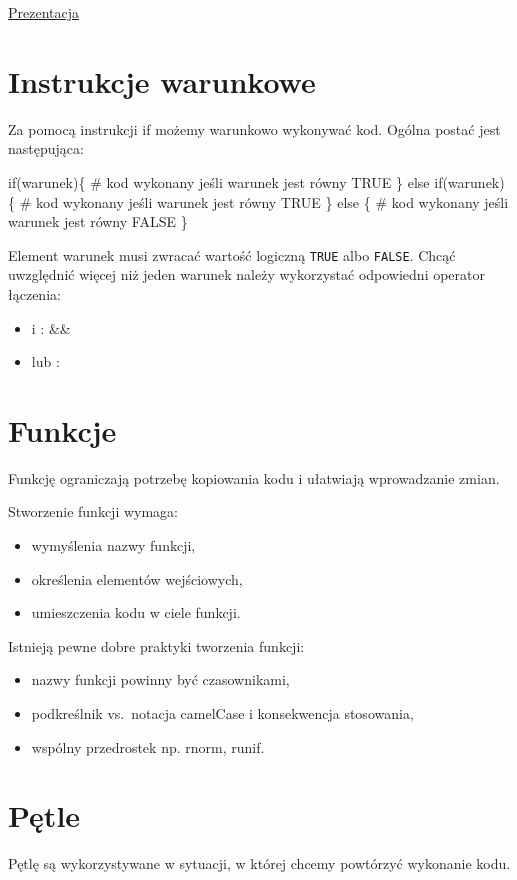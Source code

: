 \documentclass[
  letterpaper,
  DIV=11,
  numbers=noendperiod]{scrreprt}
\newenvironment{Shaded}{\begin{snugshade}}{\end{snugshade}}
\newcommand{\CommentTok}[1]{\textcolor[rgb]{0.37,0.37,0.37}{#1}}
\newcommand{\ControlFlowTok}[1]{\textcolor[rgb]{0.00,0.23,0.31}{#1}}
\newcommand{\NormalTok}[1]{\textcolor[rgb]{0.00,0.23,0.31}{#1}}
\providecommand{\tightlist}{%
  \setlength{\itemsep}{0pt}\setlength{\parskip}{0pt}}\usepackage{longtable,booktabs,array}
\begin{document}
\href{presentations/05_programowanie.html}{Prezentacja}

\hypertarget{instrukcje-warunkowe}{%
\section{Instrukcje warunkowe}\label{instrukcje-warunkowe}}

Za pomocą instrukcji if możemy warunkowo wykonywać kod. Ogólna postać
jest następująca:

\begin{Shaded}
\begin{Highlighting}[]
\ControlFlowTok{if}\NormalTok{(warunek)\{}
  \CommentTok{\# kod wykonany jeśli warunek jest równy TRUE}
\NormalTok{\} }\ControlFlowTok{else} \ControlFlowTok{if}\NormalTok{(warunek) \{}
  \CommentTok{\# kod wykonany jeśli warunek jest równy TRUE}
\NormalTok{\} }\ControlFlowTok{else}\NormalTok{ \{}
  \CommentTok{\# kod wykonany jeśli warunek jest równy FALSE}
\NormalTok{\}}
\end{Highlighting}
\end{Shaded}

Element warunek musi zwracać wartość logiczną \texttt{TRUE} albo
\texttt{FALSE}. Chcąć uwzględnić więcej niż jeden warunek należy
wykorzystać odpowiedni operator łączenia:

\begin{itemize}
\tightlist
\item
  i : \&\&
\item
  lub : \textbar\textbar{}
\end{itemize}

\hypertarget{funkcje}{%
\section{Funkcje}\label{funkcje}}

Funkcję ograniczają potrzebę kopiowania kodu i ułatwiają wprowadzanie
zmian.

Stworzenie funkcji wymaga:

\begin{itemize}
\tightlist
\item
  wymyślenia nazwy funkcji,
\item
  określenia elementów wejściowych,
\item
  umieszczenia kodu w ciele funkcji.
\end{itemize}

Istnieją pewne dobre praktyki tworzenia funkcji:

\begin{itemize}
\tightlist
\item
  nazwy funkcji powinny być czasownikami,
\item
  podkreślnik vs.~notacja camelCase i konsekwencja stosowania,
\item
  wspólny przedrostek np. rnorm, runif.
\end{itemize}

\hypertarget{pux119tle}{%
\section{Pętle}\label{pux119tle}}

Pętlę są wykorzystywane w sytuacji, w której chcemy powtórzyć wykonanie
kodu.
\end{document}
